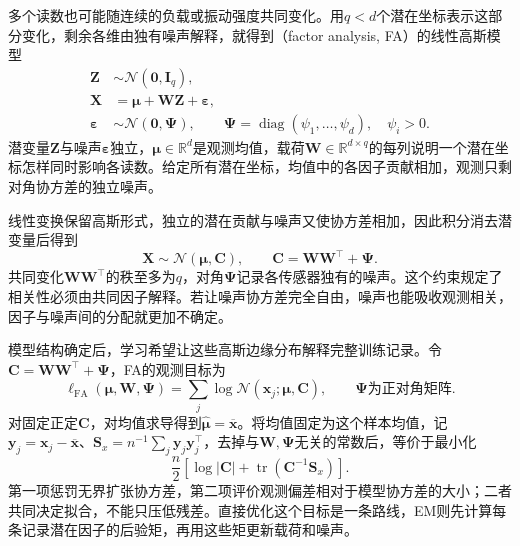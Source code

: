多个读数也可能随连续的负载或振动强度共同变化。用$q<d$个潜在坐标表示这部分变化，剩余各维由独有噪声解释，就得到（factor analysis, FA）的线性高斯模型
\begin{equation}
  \label{eq:pgm-static-directed-fa}
  \begin{aligned}
    \bm{Z}&\sim\mathcal{N}(\bm{0},\bm{I}_q),\\
    \bm{X}&=\bm{\mu}+\bm{W}\bm{Z}+\bm{\varepsilon},\\
    \bm{\varepsilon}&\sim\mathcal{N}(\bm{0},\bm{\Psi}),\qquad
    \bm{\Psi}=\operatorname{diag}(\psi_1,\ldots,\psi_d),
    \quad\psi_i>0.
  \end{aligned}
\end{equation}
潜变量$\bm Z$与噪声$\bm\varepsilon$独立，$\bm\mu\in\mathbb R^d$是观测均值，载荷$\bm W\in\mathbb R^{d\times q}$的每列说明一个潜在坐标怎样同时影响各读数。给定所有潜在坐标，均值中的各因子贡献相加，观测只剩对角协方差的独立噪声。

线性变换保留高斯形式，独立的潜在贡献与噪声又使协方差相加，因此积分消去潜变量后得到
\begin{equation}
  \label{eq:pgm-static-directed-fa-marginal}
  \bm{X}\sim\mathcal{N}(\bm{\mu},\bm{C}),\qquad
  \bm{C}=\bm{W}\bm{W}^{\top}+\bm{\Psi}.
\end{equation}
共同变化$\bm W\bm W^\top$的秩至多为$q$，对角$\bm\Psi$记录各传感器独有的噪声。这个约束规定了相关性必须由共同因子解释。若让噪声协方差完全自由，噪声也能吸收观测相关，因子与噪声间的分配就更加不确定。

模型结构确定后，学习希望让这些高斯边缘分布解释完整训练记录。令$\bm C=\bm W\bm W^\top+\bm\Psi$，FA的观测目标为
\begin{equation}
 \ell_{\mathrm{FA}}(\bm\mu,\bm W,\bm\Psi)
   =\sum_j\log\mathcal N(\bm x_j;\bm\mu,\bm C),
 \qquad \bm\Psi\text{为正对角矩阵}.
 \label{eq:pgm-static-directed-fa-objective}
\end{equation}
对固定正定$\bm C$，对均值求导得到$\widehat{\bm\mu}=\overline{\bm x}$。将均值固定为这个样本均值，记$\bm y_j=\bm x_j-\overline{\bm x}$、$\bm S_x=n^{-1}\sum_j\bm y_j\bm y_j^\top$，去掉与$\bm W,\bm\Psi$无关的常数后，等价于最小化
\[
 \frac n2\left[\log|\bm C|+
                  \operatorname{tr}(\bm C^{-1}\bm S_x)\right].
\]
第一项惩罚无界扩张协方差，第二项评价观测偏差相对于模型协方差的大小；二者共同决定拟合，不能只压低残差。直接优化这个目标是一条路线，EM则先计算每条记录潜在因子的后验矩，再用这些矩更新载荷和噪声。

